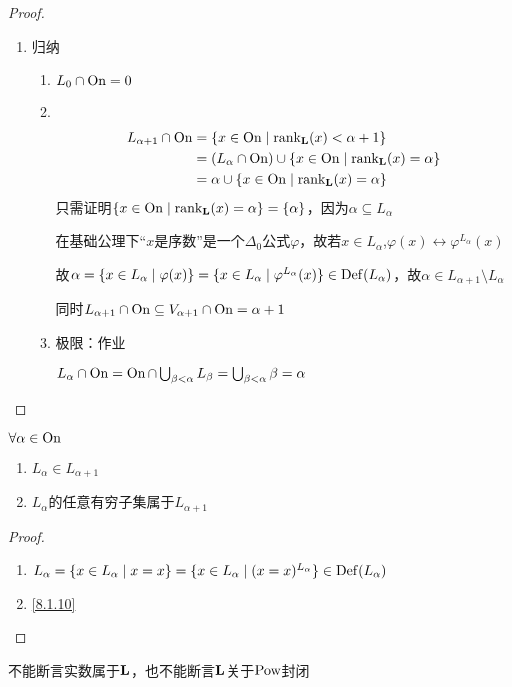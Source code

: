 \documentclass[11pt]{article}
\DeclareMathOperator{\rankl}{\rank_{\bL}}
\begin{document}
\begin{proof}
\begin{enumerate}
\item 归纳
\begin{enumerate}
\item \(L_0\cap\operatorname{On}=0\)
\item ​
\begin{align*}
L_{\alpha+1}\cap\On&=\{x\in\On\mid\rankl(x)<\alpha+1\}\\
&=(L_\alpha\cap\On)\cup\{x\in\On\mid\rankl(x)=\alpha\}\\
&=\alpha\cup\{x\in\On\mid\rankl(x)=\alpha\}
\end{align*}
只需证明\(\{x\in\On\mid\rankl(x)=\alpha\}=\{\alpha\}\)，因为\(\alpha\subseteq L_\alpha\)

在基础公理下“\(x\)是序数”是一个\(\Delta_0\)公式\(\varphi\)，故若\(x\in L_\alpha\),\(\varphi(x)\leftrightarrow\varphi^{L_\alpha}(x)\)

故\(\alpha=\{x\in L_\alpha\mid\varphi(x)\}=\{x\in L_\alpha\mid\varphi^{L_\alpha}(x)\}\in\operatorname{Def}(L_\alpha)\)，故\(\alpha\in L_{\alpha+1}\setminus L_\alpha\)

同时\(L_{\alpha+1}\cap\operatorname{On}\subseteq V_{\alpha+1}\cap\operatorname{On}=\alpha+1\)
\item 极限：作业

\(L_\alpha\cap\operatorname{On}=\operatorname{On}\cap\bigcup_{\beta<\alpha}L_\beta=\bigcup_{\beta<\alpha}\beta=\alpha\)
\end{enumerate}
\end{enumerate}
\end{proof}

\begin{lemma}[]
\(\forall\alpha\in\operatorname{On}\)
\begin{enumerate}
\item \(L_\alpha\in L_{\alpha+1}\)
\item \(L_\alpha\)的任意有穷子集属于\(L_{\alpha+1}\)
\end{enumerate}
\end{lemma}

\begin{proof}
\begin{enumerate}
\item \(L_\alpha=\{x\in L_\alpha\mid x=x\}=\{x\in L_\alpha\mid(x=x)^{L_\alpha}\}\in\operatorname{Def}(L_\alpha)\)
\item \ref{8.1.10}
\end{enumerate}
\end{proof}

不能断言实数属于\(\operatorname{\textbf{L}}\)，也不能断言\(\operatorname{\textbf{L}}\)关于\(\operatorname{Pow}\)封闭
\end{document}
